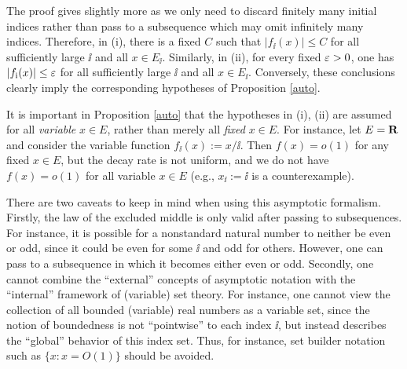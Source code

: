 \begin{remark} The proof gives slightly more as we only need to discard finitely many initial indices rather than pass to a subsequence which may omit infinitely many indices. Therefore, in (i), there is a fixed $C$ such
that $|f_{\ii}(x)|\leq C$ for all sufficiently large $\ii$ and all
$x\in E_{\ii}$.  Similarly, in (ii), for every fixed $\varepsilon>0$, one has
$|f_{{\mathrm{i}}}(x)|\leq\varepsilon$ for all sufficiently large $\ii$ and all
$x\in E_{\ii}$.  Conversely, these conclusions clearly imply the corresponding
hypotheses of Proposition \ref{auto}.
\end{remark}

\begin{remark} It is important in Proposition \ref{auto} that the hypotheses in (i), (ii) are assumed for all \emph{variable} $x \in E$, rather than merely all \emph{fixed} $x \in E$.  For instance, let $E = \mathbf{R}$ and consider the variable function $f_{\ii}(x) := x/\ii$.  Then $f(x) = o(1)$ for any fixed $x \in E$, but the decay rate is not uniform, and we do not have $f(x) = o(1)$ for all variable $x \in E$ (e.g., $x_\ii := \ii$ is a counterexample).
\end{remark}


\begin{remark} There are two caveats to keep in mind when using this asymptotic formalism.  Firstly, the law of the excluded middle is only valid after passing to subsequences.  For instance, it is possible for a nonstandard natural number to neither be even or odd, since it could be even for some $\ii$ and odd for others.  However, one can pass to a subsequence in which it becomes either even or odd.  Secondly, one cannot combine the ``external'' concepts of asymptotic notation with the ``internal'' framework of (variable) set theory.  For instance, one cannot view the collection of all bounded (variable) real numbers as a variable set, since the notion of boundedness is not ``pointwise'' to each index $\ii$, but instead describes the ``global'' behavior of this index set.  Thus, for instance, set builder notation such as $\{ x: x = O(1) \}$ should be avoided.
\end{remark}
